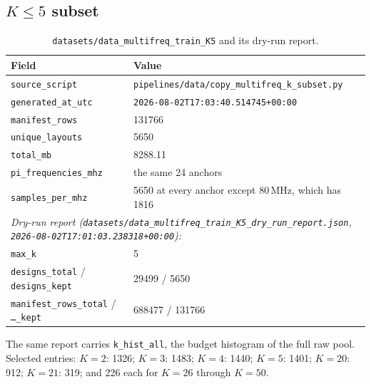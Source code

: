 \subsection{$K\le5$ subset}
\label{subsec:appA_k5}

\begin{table}[htbp]
\centering
\caption{\texttt{datasets/\allowbreak{}data\_\allowbreak{}multifreq\_\allowbreak{}train\_\allowbreak{}K5} and its dry-run report.}
\label{tab:appA_k5}
\begin{tabular}{p{} p{}}
\hline
Field & Value \\
\hline
\texttt{source\_script} & \texttt{pipelines/\allowbreak{}data/\allowbreak{}copy\_\allowbreak{}multifreq\_\allowbreak{}k\_\allowbreak{}subset.py} \\
\texttt{generated\_at\_utc} & \texttt{2026-08-02T17:03:40.514745+00:00} \\
\texttt{manifest\_rows} & 131766 \\
\texttt{unique\_layouts} & 5650 \\
\texttt{total\_mb} & 8288.11 \\
\texttt{pi\_frequencies\_mhz} & the same 24 anchors \\
\texttt{samples\_per\_mhz} & 5650 at every anchor except 80\,MHz, which has 1816 \\
\hline
\multicolumn{2}{l}{\emph{Dry-run report
(\texttt{datasets/\allowbreak{}data\_\allowbreak{}multifreq\_\allowbreak{}train\_\allowbreak{}K5\_\allowbreak{}dry\_\allowbreak{}run\_\allowbreak{}report.json},
\texttt{2026-08-02T17:01:03.238318+00:00}):}} \\
\texttt{max\_k} & 5 \\
\texttt{designs\_total} / \texttt{designs\_kept} & 29499 / 5650 \\
\texttt{manifest\_rows\_total} / \texttt{\dots\_kept} & 688477 / 131766 \\
\hline
\end{tabular}
\end{table}

The same report carries \texttt{k\_hist\_all}, the budget histogram of the full raw pool. Selected
entries: $K=2$: 1326; $K=3$: 1483; $K=4$: 1440; $K=5$: 1401; $K=20$: 912; $K=21$: 319; and 226 each
for $K=26$ through $K=50$.

